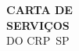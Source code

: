 \vspace*{\fill}

\begin{flushright}
\HUGE
\color{crp1}\textbf{CARTA DE\\SERVIÇOS}\\
\color{crp2}DO CRP~SP
\end{flushright}